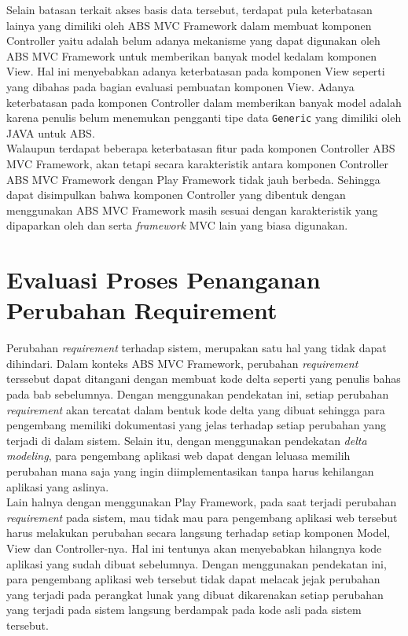 Selain batasan terkait akses basis data tersebut, terdapat pula keterbatasan lainya yang dimiliki oleh ABS MVC Framework dalam membuat komponen Controller yaitu adalah belum adanya mekanisme yang dapat digunakan oleh ABS MVC Framework untuk memberikan banyak model kedalam komponen View. Hal ini menyebabkan adanya keterbatasan pada komponen View seperti yang dibahas pada bagian evaluasi pembuatan komponen View. Adanya keterbatasan pada komponen Controller dalam memberikan banyak model adalah karena penulis belum menemukan pengganti tipe data \texttt{Generic} yang dimiliki oleh JAVA untuk ABS.\\

Walaupun terdapat beberapa keterbatasan fitur pada komponen Controller ABS MVC Framework, akan tetapi secara karakteristik antara komponen Controller ABS MVC Framework dengan Play Framework tidak jauh berbeda. Sehingga dapat disimpulkan bahwa komponen Controller yang dibentuk dengan menggunakan ABS MVC Framework masih sesuai dengan karakteristik yang dipaparkan oleh \cite{krasner1988desc} dan \cite{leff2001web} serta \textit{framework} MVC lain yang biasa digunakan.

\section{Evaluasi Proses Penanganan Perubahan Requirement}

Perubahan \textit{requirement} terhadap sistem, merupakan satu hal yang tidak dapat dihindari. Dalam konteks ABS MVC Framework, perubahan \textit{requirement} terssebut dapat ditangani dengan membuat kode delta seperti yang penulis bahas pada bab sebelumnya. Dengan menggunakan pendekatan ini, setiap perubahan \textit{requirement} akan tercatat dalam bentuk kode delta yang dibuat sehingga para pengembang memiliki dokumentasi yang jelas terhadap setiap perubahan yang terjadi di dalam sistem. Selain itu, dengan menggunakan pendekatan \textit{delta modeling}, para pengembang aplikasi web dapat dengan leluasa memilih perubahan mana saja yang ingin diimplementasikan tanpa harus kehilangan aplikasi yang aslinya.\\

Lain halnya dengan menggunakan Play Framework, pada saat terjadi perubahan \textit{requirement} pada sistem, mau tidak mau para pengembang aplikasi web tersebut harus melakukan perubahan secara langsung terhadap setiap komponen Model, View dan Controller-nya. Hal ini tentunya akan menyebabkan hilangnya kode aplikasi yang sudah dibuat sebelumnya. Dengan menggunakan pendekatan ini, para pengembang aplikasi web tersebut tidak dapat melacak jejak perubahan yang terjadi pada perangkat lunak yang dibuat dikarenakan setiap perubahan yang terjadi pada sistem langsung berdampak pada kode asli pada sistem tersebut.\\


